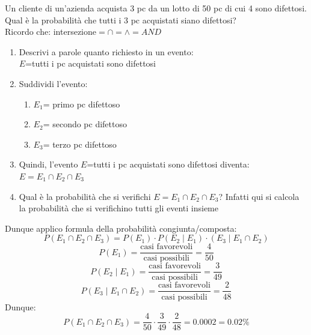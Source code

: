 \documentclass{article}  %
\theoremstyle{definition}
\begin{document}
\begin{esercizio}[Esercizio]
	Un cliente di un'azienda acquista 3 pc da un lotto di 50 pc di cui 4 sono difettosi. Qual è la probabilità che tutti i 3 pc acquistati siano difettosi? \\
	Ricordo che: intersezione$=\cap=\land=AND$
	\begin{enumerate}
		\item Descrivi a parole quanto richiesto in un evento: \\ $E$=tutti i pc acquistati sono difettosi
		\item Suddividi l'evento:
		      \begin{enumerate}
			      \item $E_1$= primo pc difettoso
			      \item $E_2$= secondo pc difettoso
			      \item $E_3$= terzo pc difettoso
		      \end{enumerate}
		\item Quindi, l'evento $E$=tutti i pc acquistati sono difettosi diventa: \\ $E=E_1 \cap E_2 \cap E_3$
		\item Qual è la probabilità che si verifichi $E=E_1 \cap E_2 \cap E_3$? Infatti qui si calcola la probabilità che si verifichino tutti gli eventi insieme
	\end{enumerate}
	Dunque applico formula della probabilità congiunta/composta:
	\[
		P(E_1 \cap E_2 \cap E_3)=P(E_1)\cdot P(E_2 \mid E_1) \cdot (E_3 \mid E_1 \cap E_2)
	\]
	\[
		P(E_1)=\frac{\text{casi favorevoli}}{\text{casi possibili}}=\frac{4}{50}
	\]
	\[
		P(E_2 \mid E_1)=\frac{\text{casi favorevoli}}{\text{casi possibili}}=\frac{3}{49}
	\]
	\[
		P(E_3 \mid E_1 \cap E_2)=\frac{\text{casi favorevoli}}{\text{casi possibili}}=\frac{2}{48}
	\]
	Dunque:
	\[
		P(E_1 \cap E_2 \cap E_3)=\frac{4}{50} \cdot \frac{3}{49} \cdot \frac{2}{48}=0.0002=0.02\%
	\]
\end{esercizio}
\end{document}
